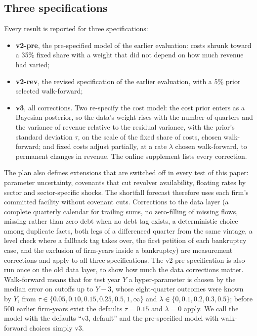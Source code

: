 \subsection{Three specifications}\label{sec:specs}
Every result is reported for three specifications:
\begin{itemize}
\item \textbf{v2-pre}, the pre-specified model of the earlier evaluation: costs shrunk toward a 35\% fixed share with a weight that did not depend on how much revenue had varied;
\item \textbf{v2-rev}, the revised specification of the earlier evaluation, with a 5\% prior selected walk-forward;
\item \textbf{v3}, all corrections. Two re-specify the cost model: the cost prior enters as a Bayesian posterior, so the data's weight rises with the number of quarters and the variance of revenue relative to the residual variance, with the prior's standard deviation $\tau$, on the scale of the fixed share of costs, chosen walk-forward; and fixed costs adjust partially, at a rate $\lambda$ chosen walk-forward, to permanent changes in revenue. The online supplement lists every correction.
\end{itemize}
The plan also defines extensions that are switched off in every test of this paper: parameter uncertainty, covenants that cut revolver availability, floating rates by sector and sector-specific shocks. The shortfall forecast therefore uses each firm's committed facility without covenant cuts.
Corrections to the data layer (a complete quarterly calendar for trailing sums, no zero-filling of missing flows, missing rather than zero debt when no debt tag exists, a deterministic choice among duplicate facts, both legs of a differenced quarter from the same vintage, a level check where a fallback tag takes over, the first petition of each bankruptcy case, and the exclusion of firm-years inside a bankruptcy) are measurement corrections and apply to all three specifications. The v2-pre specification is also run once on the old data layer, to show how much the data corrections matter. Walk-forward means that for test year $Y$ a hyper-parameter is chosen by the median error on cutoffs up to $Y-3$, whose eight-quarter outcomes were known by $Y$, from $\tau\in\{0.05,0.10,0.15,0.25,0.5,1,\infty\}$ and $\lambda\in\{0,0.1,0.2,0.3,0.5\}$; before 500 earlier firm-years exist the defaults $\tau=0.15$ and $\lambda=0$ apply. We call the model with the defaults ``v3, default'' and the pre-specified model with walk-forward choices simply v3.

